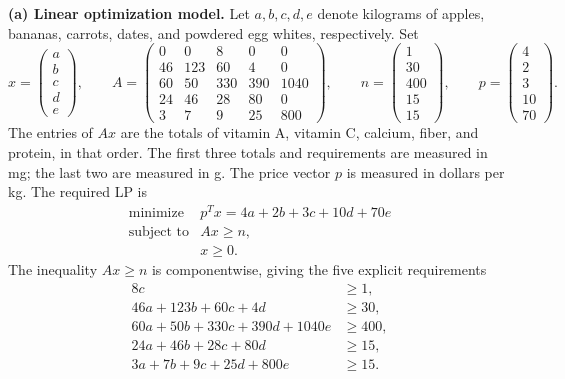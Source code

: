 \documentclass[11pt]{article}
\begin{document}
\textbf{(a) Linear optimization model.}
Let $a, b, c, d, e$ denote kilograms of apples, bananas, carrots, dates, and powdered egg whites, respectively. Set
\[
x = \begin{pmatrix} a \\ b \\ c \\ d \\ e \end{pmatrix}, \qquad
A = \begin{pmatrix}
  0  & 0   & 8   & 0   & 0    \\
  46 & 123 & 60  & 4   & 0    \\
  60 & 50  & 330 & 390 & 1040 \\
  24 & 46  & 28  & 80  & 0    \\
  3  & 7   & 9   & 25  & 800
\end{pmatrix}, \qquad
n = \begin{pmatrix} 1 \\ 30 \\ 400 \\ 15 \\ 15 \end{pmatrix}, \qquad
p = \begin{pmatrix} 4 \\ 2 \\ 3 \\ 10 \\ 70 \end{pmatrix}.
\]
The entries of $Ax$ are the totals of vitamin A, vitamin C, calcium, fiber, and protein, in that order. The first three totals and requirements are measured in mg; the last two are measured in g. The price vector $p$ is measured in dollars per kg. The required LP is
\[
\boxed{
\begin{array}{rl}
  \text{minimize}   & p^T x = 4a + 2b + 3c + 10d + 70e \\[2pt]
  \text{subject to} & Ax \ge n, \\[2pt]
                    & x \ge 0.
\end{array}
}
\]
The inequality $Ax \ge n$ is componentwise, giving the five explicit requirements
\begin{align*}
  8c &\ge 1, \\
  46a + 123b + 60c + 4d &\ge 30, \\
  60a + 50b + 330c + 390d + 1040e &\ge 400, \\
  24a + 46b + 28c + 80d &\ge 15, \\
  3a + 7b + 9c + 25d + 800e &\ge 15.
\end{align*}
\end{document}
